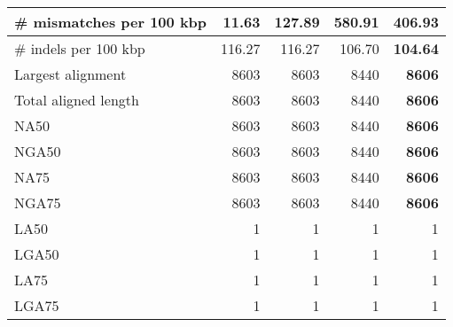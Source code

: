 \documentclass[12pt,a4paper]{article}
\begin{document}
\begin{table}[ht]
\begin{center}
\begin{tabular}{|l*{4}{|r}|}
\# mismatches per 100 kbp & {\bf 11.63} & 127.89 & 580.91 & 406.93 \\ \hline
\# indels per 100 kbp & 116.27 & 116.27 & 106.70 & {\bf 104.64} \\ \hline
Largest alignment & 8603 & 8603 & 8440 & {\bf 8606} \\ \hline
Total aligned length & 8603 & 8603 & 8440 & {\bf 8606} \\ \hline
NA50 & 8603 & 8603 & 8440 & {\bf 8606} \\ \hline
NGA50 & 8603 & 8603 & 8440 & {\bf 8606} \\ \hline
NA75 & 8603 & 8603 & 8440 & {\bf 8606} \\ \hline
NGA75 & 8603 & 8603 & 8440 & {\bf 8606} \\ \hline
LA50 & 1 & 1 & 1 & 1 \\ \hline
LGA50 & 1 & 1 & 1 & 1 \\ \hline
LA75 & 1 & 1 & 1 & 1 \\ \hline
LGA75 & 1 & 1 & 1 & 1 \\ \hline
\end{tabular}
\end{center}
\end{table}
\end{document}
